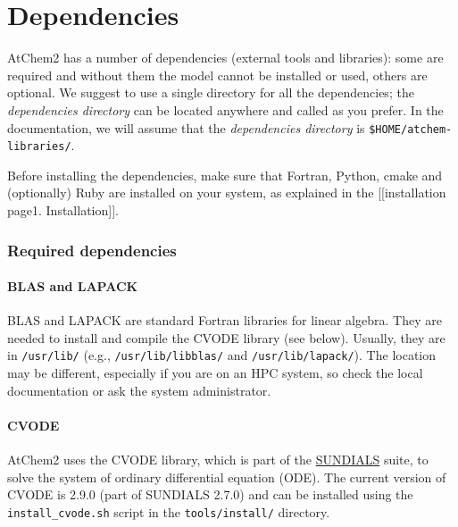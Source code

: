 \chapter{Dependencies}

AtChem2 has a number of dependencies (external tools and libraries):
some are required and without them the model cannot be installed or
used, others are optional. We suggest to use a single directory for all
the dependencies; the \emph{dependencies directory} can be located
anywhere and called as you prefer. In the documentation, we will assume
that the \emph{dependencies directory} is
\texttt{\$HOME/atchem-libraries/}.

Before installing the dependencies, make sure that Fortran, Python,
cmake and (optionally) Ruby are installed on your system, as explained
in the {[}{[}installation page\textbar{}1. Installation{]}{]}.

\hypertarget{required-dependencies}{%
\subsection{Required dependencies}\label{required-dependencies}}

\hypertarget{blas-and-lapack}{%
\subsubsection{BLAS and LAPACK}\label{blas-and-lapack}}

BLAS and LAPACK are standard Fortran libraries for linear algebra. They
are needed to install and compile the CVODE library (see below).
Usually, they are in \texttt{/usr/lib/} (e.g.,
\texttt{/usr/lib/libblas/} and \texttt{/usr/lib/lapack/}). The location
may be different, especially if you are on an HPC system, so check the
local documentation or ask the system administrator.

\hypertarget{cvode}{%
\subsubsection{CVODE}\label{cvode}}

AtChem2 uses the CVODE library, which is part of the
\href{https://computation.llnl.gov/projects/sundials}{SUNDIALS} suite,
to solve the system of ordinary differential equation (ODE). The current
version of CVODE is 2.9.0 (part of SUNDIALS 2.7.0) and can be installed
using the \texttt{install\_cvode.sh} script in the
\texttt{tools/install/} directory.

